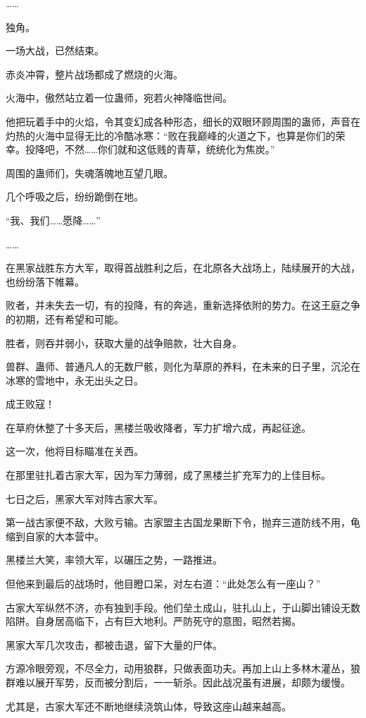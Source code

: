 \begin{this_body}
……

独角。

一场大战，已然结束。

赤炎冲霄，整片战场都成了燃烧的火海。

火海中，傲然站立着一位蛊师，宛若火神降临世间。

他把玩着手中的火焰，令其变幻成各种形态，细长的双眼环顾周围的蛊师，声音在灼热的火海中显得无比的冷酷冰寒：“败在我巅峰的火道之下，也算是你们的荣幸。投降吧，不然……你们就和这低贱的青草，统统化为焦炭。”

周围的蛊师们，失魂落魄地互望几眼。

几个呼吸之后，纷纷跪倒在地。

“我、我们……愿降……”

……

在黑家战胜东方大军，取得首战胜利之后，在北原各大战场上，陆续展开的大战，也纷纷落下帷幕。

败者，并未失去一切，有的投降，有的奔逃，重新选择依附的势力。在这王庭之争的初期，还有希望和可能。

胜者，则吞并弱小，获取大量的战争赔款，壮大自身。

兽群、蛊师、普通凡人的无数尸骸，则化为草原的养料，在未来的日子里，沉沦在冰寒的雪地中，永无出头之日。

成王败寇！

在草府休整了十多天后，黑楼兰吸收降者，军力扩增六成，再起征途。

这一次，他将目标瞄准在关西。

在那里驻扎着古家大军，因为军力薄弱，成了黑楼兰扩充军力的上佳目标。

七日之后，黑家大军对阵古家大军。

第一战古家便不敌，大败亏输。古家盟主古国龙果断下令，抛弃三道防线不用，龟缩到自家的大本营中。

黑楼兰大笑，率领大军，以碾压之势，一路推进。

但他来到最后的战场时，他目瞪口呆，对左右道：“此处怎么有一座山？”

古家大军纵然不济，亦有独到手段。他们垒土成山，驻扎山上，于山脚出铺设无数陷阱。自身居高临下，占有巨大地利。严防死守的意图，昭然若揭。

黑家大军几次攻击，都被击退，留下大量的尸体。

方源冷眼旁观，不尽全力，动用狼群，只做表面功夫。再加上山上多林木灌丛，狼群难以展开军势，反而被分割后，一一斩杀。因此战况虽有进展，却颇为缓慢。

尤其是，古家大军还不断地继续浇筑山体，导致这座山越来越高。


\end{this_body}
